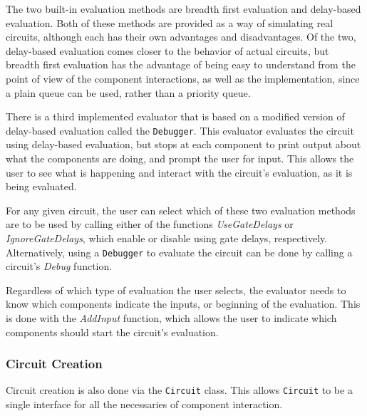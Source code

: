 \documentclass{article}
\newcommand{\ClassName}[1]{\texttt{#1}}
\newcommand{\FunctionName}[1]{\textit{#1}}
\begin{document}
The two built-in evaluation methods are breadth first evaluation and delay-based evaluation. Both of these methods are provided as a way of simulating real circuits, although each has their own advantages and disadvantages. Of the two, delay-based evaluation comes closer to the behavior of actual circuits, but breadth first evaluation has the advantage of being easy to understand from the point of view of the component interactions, as well as the implementation, since a plain queue can be used, rather than a priority queue.

There is a third implemented evaluator that is based on a modified version of delay-based evaluation called the \ClassName{Debugger}. This evaluator evaluates the circuit using delay-based evaluation, but stops at each component to print output about what the components are doing, and prompt the user for input. This allows the user to see what is happening and interact with the circuit’s evaluation, as it is being evaluated.

For any given circuit, the user can select which of these two evaluation methods are to be used by calling either of the functions \FunctionName{UseGateDelays} or \FunctionName{IgnoreGateDelays}, which enable or disable using gate delays, respectively. Alternatively, using a \ClassName{Debugger} to evaluate the circuit can be done by calling a circuit’s \FunctionName{Debug} function.

Regardless of which type of evaluation the user selects, the evaluator needs to know which components indicate the inputs, or beginning of the evaluation. This is done with the \FunctionName{AddInput} function, which allows the user to indicate which components should start the circuit’s evaluation.

\subsubsection{Circuit Creation}

Circuit creation is also done via the \ClassName{Circuit} class. This allows \ClassName{Circuit} to be a single interface for all the necessaries of component interaction.
\end{document}
